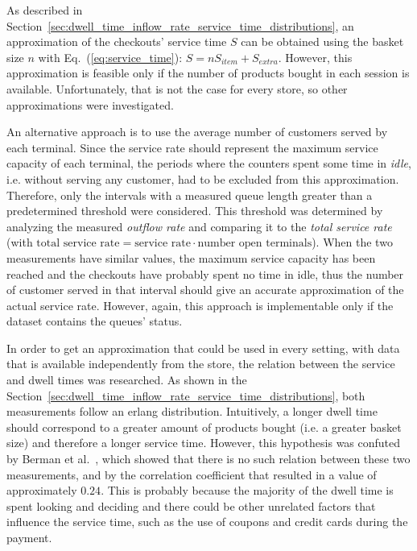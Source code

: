 As described in Section~\ref{sec:dwell_time_inflow_rate_service_time_distributions}, an approximation of the checkouts' service time \( S \) can be obtained using the basket size \( n \) with Eq.~(\ref{eq:service_time}): \( S = n S_{item} + S_{extra} \). However, this approximation is feasible only if the number of products bought in each session is available. Unfortunately, that is not the case for every store, so other approximations were investigated.

An alternative approach is to use the average number of customers served by each terminal. Since the service rate should represent the maximum service capacity of each terminal, the periods where the counters spent some time in \emph{idle}, i.e. without serving any customer, had to be excluded from this approximation. Therefore, only the intervals with a measured queue length greater than a predetermined threshold were considered. This threshold was determined by analyzing the measured \emph{outflow rate} and comparing it to the \emph{total service rate} (with \(\text{total service rate} = \text{service rate} \cdot \text{number open terminals} \)). When the two measurements have similar values, the maximum service capacity has been reached and the checkouts have probably spent no time in idle, thus the number of customer served in that interval should give an accurate approximation of the actual service rate. However, again, this approach is implementable only if the dataset contains the queues’ status.

In order to get an approximation that could be used in every setting, with data that is available independently from the store, the relation between the service and dwell times was researched. As shown in the Section~\ref{sec:dwell_time_inflow_rate_service_time_distributions}, both measurements follow an erlang distribution. Intuitively, a longer dwell time should correspond to a greater amount of products bought (i.e. a greater basket size) and therefore a longer service time. However, this hypothesis was confuted by Berman et al.~\cite{berman}, which showed that there is no such relation between these two measurements, and by the correlation coefficient that resulted in a value of approximately \( 0.24 \). This is probably because the majority of the dwell time is spent looking and deciding and there could be other unrelated factors that influence the service time, such as the use of coupons and credit cards during the payment.

